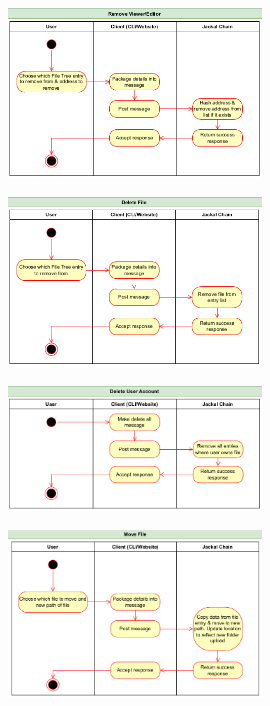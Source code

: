 \documentclass[a4paper]{article}
\begin{document}
\begin{figure}[!htbp]
\centering
\includegraphics[width=0.6\textwidth]{assets/filetree5.png}
\caption{}
\end{figure}

\begin{figure}[!htbp]
\centering
\includegraphics[width=0.6\textwidth]{assets/filetree6.png}
\caption{}
\end{figure}

\begin{figure}[!htbp]
\centering
\includegraphics[width=0.6\textwidth]{assets/filetree7.png}
\caption{}
\end{figure}

\begin{figure}[!htbp]
\centering
\includegraphics[width=0.6\textwidth]{assets/filetree8.png}
\caption{}
\end{figure}
\end{document}
